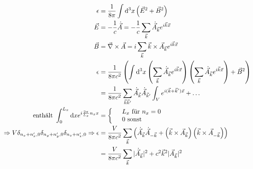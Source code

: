 \documentclass[a4paper]{article}
\begin{document}
\begin{align}
\epsilon&=\frac{1}{8\pi}\int \mathrm{d}^3x\left(\vec{E}^2+\vec{B}^2\right)\\
\vec{E}&=-\frac{1}{c}\dot{\vec{A}}=-\frac{1}{c}
\sum_{\vec{k}}\dot{\vec{A}}_{\vec{k}}e^{i\vec{k}\vec{x}}\\
\vec{B}&=\vec{\nabla}\times\vec{A}=i
\sum_{\vec{k}}\vec{k}\times\vec{A}_{\vec{k}}e^{i\vec{k}\vec{x}}\\
\epsilon&=\frac{1}{8\pi c^2}\left( \int \mathrm{d}^3x \left(
\sum_{\vec{k}}\dot{\vec{A}}_{\vec{k}}e^{i\vec{k}\vec{x}} \right) \left(
\sum_{\vec{k}}\dot{\vec{A}}_{\vec{k}}e^{i\vec{k}\vec{x}} \right)+\vec{B}^2
\right)\\
&=\frac{1}{8\pi c^2}\sum_{\vec{k}\vec{k}'}\dot{\vec{A}}_{\vec{k}}
\dot{\vec{A}}_{\vec{k}'} \int_V e^{i(\vec{k}+\vec{k}')\vec{x}}+\ldots\\
\text{enthält } \int_0^{L_x}\mathrm{d}x e^{i\frac{2\pi}{L_x}n_xx} &=\left\lbrace %
\begin{array}{l l }
& L_x \text{ für }n_x=0 \\ 
& 0 \text{ sonst}
\end{array}\right.
\\
\Rightarrow V\delta_{n_x+n_x',0}\delta_{n_y+n_y',0}\delta_{n_z+n_z',0}
\Rightarrow \epsilon &=\frac{V}{8\pi c^2}\sum_{\vec{k}}\left(\dot{\vec{A}}_{\vec{k}}
\dot{\vec{A}}_{-\vec{k}} + \left( \vec{k}\times{\vec{A}}_{\vec{k}}\right)
\left( \vec{k}\times{\vec{A}}_{-\vec{k}}\right) \right)\\
&=\frac{V}{8\pi c^2}\sum_{\vec{k}}|\dot{\vec{A}}_{\vec{k}}|^2+c^2
\vec{k}^2|{\vec{A}}_{\vec{k}}|^2\\
\end{align}
\end{document}
